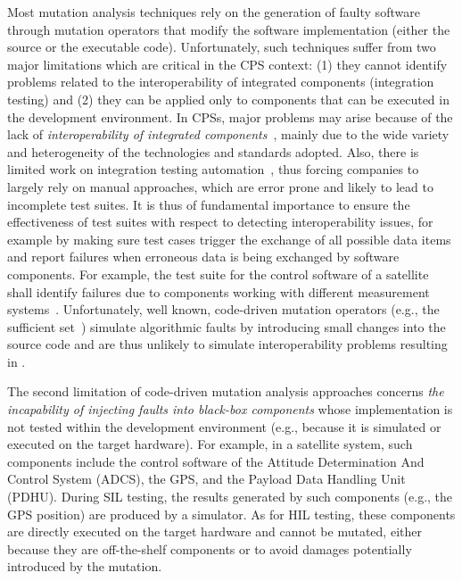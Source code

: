 Most mutation analysis techniques rely on the generation of faulty software through mutation operators that modify the software implementation (either the source or the executable code). 
Unfortunately, such techniques suffer from two major limitations which are critical in the CPS context: (1) they cannot identify problems related to the interoperability of integrated components (integration testing) and (2) they can be applied only to components that can be executed in the development environment.
In CPSs, major problems may arise because of the lack of  \emph{interoperability of integrated components}~\cite{Givehchi:2017,Jirkovsk:2017}, mainly due to the wide variety and heterogeneity of the technologies and standards adopted.
Also, there is  limited work on integration testing automation~\cite{Abbaspour:2015}, thus forcing companies to largely rely on manual approaches, which are error prone and likely to lead to incomplete test suites. 
It is thus of fundamental importance to ensure the effectiveness of test suites with respect to detecting interoperability issues, for example by making sure test cases trigger the exchange of all possible data items and report failures when erroneous data is being exchanged by software components. For example, the test suite for the control software of a satellite shall identify failures due to components working with different measurement systems~\cite{MarsClimateOrbiter}.
Unfortunately, well known, code-driven mutation operators (e.g., the sufficient set~\cite{delamaro2014designing,delamaro2014experimental}) simulate algorithmic faults by introducing small changes into the source code and are thus unlikely to simulate interoperability problems resulting in . 


The second limitation of code-driven mutation analysis approaches concerns \emph{the incapability of injecting faults into black-box components} whose implementation is not tested within the development environment (e.g., because it is simulated or executed on the target hardware).
For example, in a satellite system, such components include the control software of the Attitude Determination And Control System (ADCS), the GPS, and the Payload Data Handling Unit (PDHU). During SIL testing, the results generated by such components (e.g., the GPS position) are produced by a simulator. As for HIL testing, these components are directly executed on the target hardware and cannot be mutated, either because they are off-the-shelf components 
or 
to avoid damages potentially introduced by the mutation.

